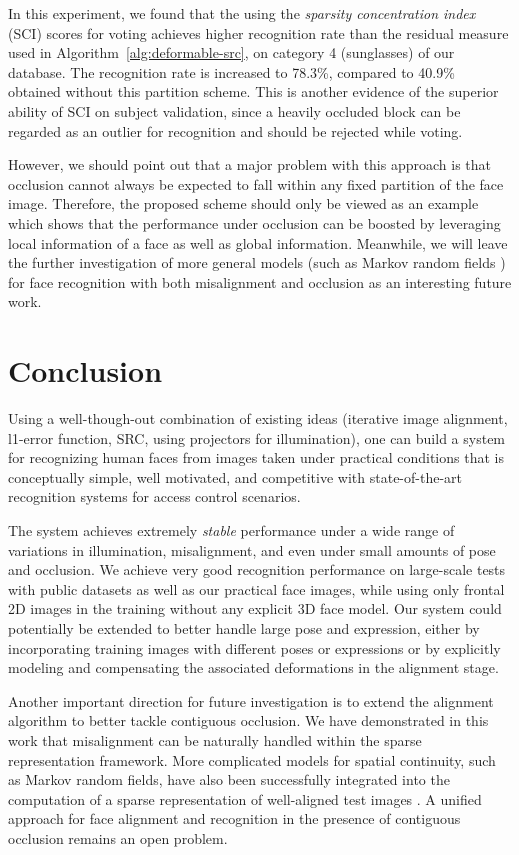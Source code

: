 \documentclass[12pt,journal,draftcls,letterpaper,onecolumn]{IEEEtran}
\begin{document}
In this experiment, we found that the using the \emph{sparsity
concentration index} (SCI) scores for voting achieves higher
recognition rate than the residual measure used in Algorithm~\ref{alg:deformable-src}, on
category 4 (sunglasses) of our database. The recognition rate
is increased to 78.3\%, compared to 40.9\% obtained without
this partition scheme. This is another evidence of the superior
ability of SCI on subject validation, since a heavily occluded
block can be regarded as an outlier for recognition and should
be rejected while voting.

However, we should point out that a major problem with this
approach is that occlusion cannot always be expected to fall within
 any fixed partition of the face image. Therefore, the
proposed scheme should only be viewed as an example which shows
that the performance under occlusion can be boosted by
leveraging local information of a face as well as global information. Meanwhile, we will
leave the further investigation of more general models (such as Markov
random fields \cite{ZhouZ2009}) for face
recognition with both misalignment and occlusion as an
interesting future work.\vspace{-0.2in}

\section{Conclusion}\label{sec:conclusion}
Using a well-though-out combination of existing ideas
(iterative image alignment, l1-error function, SRC, using projectors for
illumination), one can build a system for recognizing human faces
from images taken under practical conditions that is conceptually simple, well
motivated, and competitive with state-of-the-art recognition systems for access
control scenarios. 

The system achieves extremely {\em stable} performance under
a wide range of variations in illumination, misalignment, and even under small amounts of
pose and occlusion. We achieve very good recognition performance on
large-scale tests with public datasets as well as our practical face
images, while using only frontal 2D images in the training without
any explicit 3D face model.
Our system could potentially be extended to better handle large pose
and expression, either by incorporating training images with different poses or
expressions or by explicitly modeling and compensating the associated deformations
in the alignment stage.

Another important direction for future
investigation is to extend the alignment algorithm to better
tackle contiguous occlusion. We have demonstrated in this
work that misalignment can be naturally handled within the
sparse representation framework. More complicated models for
spatial continuity, such as Markov random fields, have also
been successfully integrated into the computation of a sparse
representation of well-aligned test images
\cite{Cevher2008-NIPS, ZhouZ2009}. A unified approach
for face alignment and recognition in the presence of
contiguous occlusion remains an open problem. \vspace{-0.2in}
\end{document}
